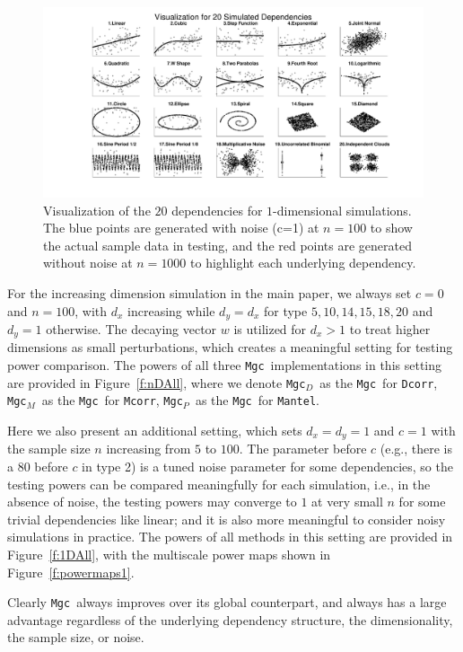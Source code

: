 \documentclass[11pt]{article}
\providecommand{\sct}[1]{{\sc \texttt{#1}}}
\newcommand{\Mgc}{\sct{Mgc}}
\newcommand{\Mgcp}{\sct{Mgc$_P$}}
\newcommand{\Mgcd}{\sct{Mgc$_D$}}
\newcommand{\Mgcm}{\sct{Mgc$_M$}}
\newcommand{\Dcorr}{\sct{Dcorr}}
\newcommand{\Mcorr}{\sct{Mcorr}}
\newcommand{\Mantel}{\sct{Mantel}}
\begin{document}
\begin{figure}[htbp]
\includegraphics[trim={5cm 0 3.5cm 0},clip, width=1.0\textwidth]{../Figures/FigSimVisual}
\caption{Visualization of the $20$ dependencies for $1$-dimensional simulations. The blue points are generated with noise (c=1) at $n=100$ to show the actual sample data in testing, and the red points are generated without noise at $n=1000$ to highlight each underlying dependency.
}
\label{f:dependencies}
\end{figure}

For the increasing dimension simulation in the main paper, we always set $c=0$ and $n=100$, with $d_{x}$ increasing while $d_{y}=d_{x}$ for type $5,10,14,15,18,20$ and $d_{y}=1$ otherwise. The decaying vector $w$ is utilized for $d_{x}>1$ to treat higher dimensions as small perturbations, which creates a meaningful setting for testing power comparison. The powers of all three \Mgc~implementations in this setting are provided in Figure~\ref{f:nDAll}, where we denote \Mgcd~as the \Mgc~for \Dcorr, \Mgcm~as the \Mgc~for \Mcorr, \Mgcp~as the \Mgc~for \Mantel.

Here we also present an additional setting, which sets $d_{x}=d_{y}=1$ and $c=1$ with the sample size $n$ increasing from $5$ to $100$. The parameter before $c$ (e.g., there is a $80$ before $c$ in type 2) is a tuned noise parameter for some dependencies, so the testing powers can be compared meaningfully for each simulation, i.e., in the absence of noise, the testing powers may converge to $1$ at very small $n$ for some trivial dependencies like linear; and it is also more meaningful to consider noisy simulations in practice. The powers of all methods in this setting are provided in Figure~\ref{f:1DAll}, with the multiscale power maps shown in Figure~\ref{f:powermaps1}.

Clearly \Mgc~always improves over its global counterpart, and always has a large advantage regardless of the underlying dependency structure, the dimensionality, the sample size, or noise.
\end{document}
